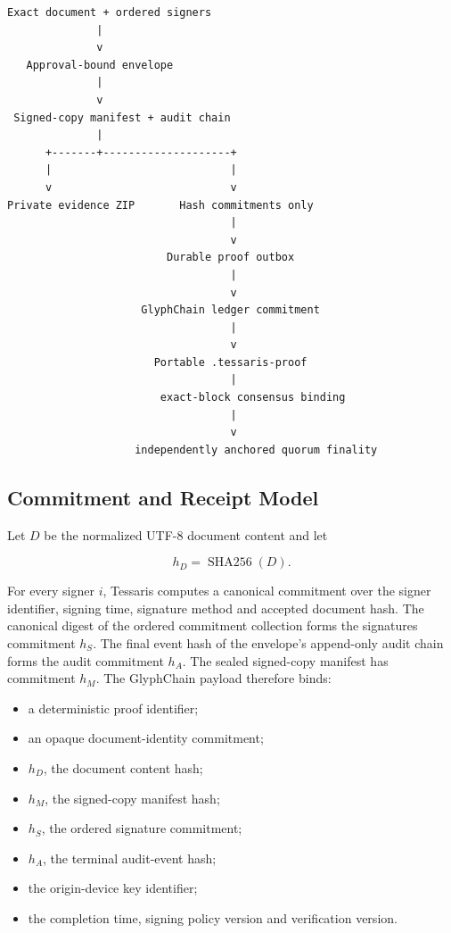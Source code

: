 \begin{verbatim}
Exact document + ordered signers
              |
              v
   Approval-bound envelope
              |
              v
 Signed-copy manifest + audit chain
              |
      +-------+--------------------+
      |                            |
      v                            v
Private evidence ZIP       Hash commitments only
                                   |
                                   v
                         Durable proof outbox
                                   |
                                   v
                     GlyphChain ledger commitment
                                   |
                                   v
                       Portable .tessaris-proof
                                   |
                        exact-block consensus binding
                                   |
                                   v
                    independently anchored quorum finality
\end{verbatim}

\subsection{Commitment and Receipt Model}

Let $D$ be the normalized UTF-8 document content and let

\[
  h_D = \operatorname{SHA256}(D).
\]

For every signer $i$, Tessaris computes a canonical commitment over the signer
identifier, signing time, signature method and accepted document hash.  The
canonical digest of the ordered commitment collection forms the signatures
commitment $h_S$.  The final event hash of the envelope's append-only audit chain
forms the audit commitment $h_A$.  The sealed signed-copy manifest has commitment
$h_M$.  The GlyphChain payload therefore binds:

\begin{itemize}
  \item a deterministic proof identifier;
  \item an opaque document-identity commitment;
  \item $h_D$, the document content hash;
  \item $h_M$, the signed-copy manifest hash;
  \item $h_S$, the ordered signature commitment;
  \item $h_A$, the terminal audit-event hash;
  \item the origin-device key identifier;
  \item the completion time, signing policy version and verification version.
\end{itemize}

